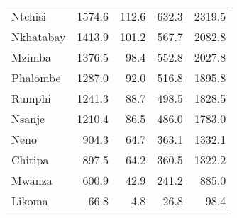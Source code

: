 \begin{tabular}{lrrrr}
Ntchisi        &    1574.6 &   112.6 &    632.3 &    2319.5 \\
Nkhatabay      &    1413.9 &   101.2 &    567.7 &    2082.8 \\
Mzimba         &    1376.5 &    98.4 &    552.8 &    2027.8 \\
Phalombe       &    1287.0 &    92.0 &    516.8 &    1895.8 \\
Rumphi         &    1241.3 &    88.7 &    498.5 &    1828.5 \\
Nsanje         &    1210.4 &    86.5 &    486.0 &    1783.0 \\
Neno           &     904.3 &    64.7 &    363.1 &    1332.1 \\
Chitipa        &     897.5 &    64.2 &    360.5 &    1322.2 \\
Mwanza         &     600.9 &    42.9 &    241.2 &     885.0 \\
Likoma         &      66.8 &     4.8 &     26.8 &      98.4 \\
\bottomrule
\end{tabular}
